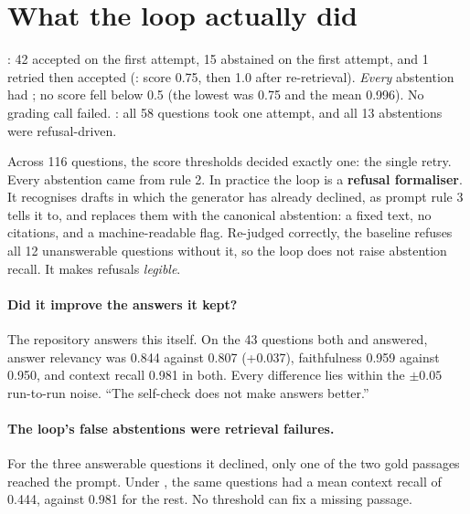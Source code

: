 \section{What the loop actually did}
\label{sec:loop-evidence}

\begin{verified}
: 42 accepted on the first attempt, 15 abstained on the first attempt, and 1 retried then accepted (: score 0.75, then 1.0 after re-retrieval). \emph{Every} abstention had ; no score fell below 0.5 (the lowest was 0.75 and the mean 0.996). No grading call failed. : all 58 questions took one attempt, and all 13 abstentions were refusal-driven.
\end{verified}

\begin{keyidea}
Across 116 questions, the score thresholds decided exactly one: the single retry. Every abstention came from rule 2. In practice the loop is a \textbf{refusal formaliser}. It recognises drafts in which the generator has already declined, as prompt rule 3 tells it to, and replaces them with the canonical abstention: a fixed text, no citations, and a machine-readable flag. Re-judged correctly, the baseline refuses all 12 unanswerable questions without it, so the loop does not raise abstention recall. It makes refusals \emph{legible}.
\end{keyidea}

\paragraph{Did it improve the answers it kept?} The repository answers this itself. On the 43 questions both  and  answered, answer relevancy was 0.844 against 0.807 (+0.037), faithfulness 0.959 against 0.950, and context recall 0.981 in both. Every difference lies within the $\pm0.05$ run-to-run noise. ``The self-check does not make answers better.''

\paragraph{The loop's false abstentions were retrieval failures.} For the three answerable questions it declined, only one of the two gold passages reached the prompt. Under , the same questions had a mean context recall of 0.444, against 0.981 for the rest. No threshold can fix a missing passage.

